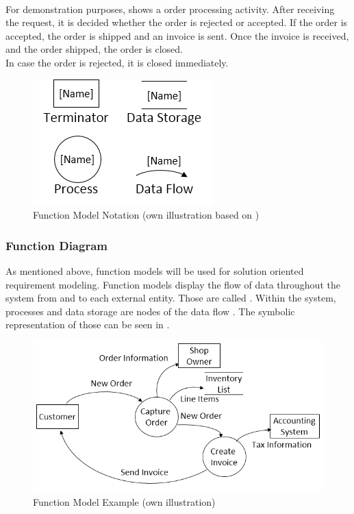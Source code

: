 \paragraph{} For demonstration purposes,  shows a order processing activity. After receiving the request, it is decided whether the order is rejected or accepted. If the order is accepted, the order is shipped and an invoice is sent. Once the invoice is received, and the order shipped, the order is closed. \\
In case the order is rejected, it is closed immediately. 

\begin{figure}[H]
    \centering
    \includegraphics[scale=0.9]{img/fmSymb.png}
    \caption[Function Model Notation]{Function Model Notation (own illustration based on \cite[190]{Pohl.2007})}
    \label{fig:fmSymb}
\end{figure}


\subsubsection{Function Diagram}

As mentioned above, function models will be used for solution oriented requirement modeling. Function models display the flow of data throughout the system from and to each external entity. Those are called  \parencite[190]{Pohl.2007}. Within the system, processes and data storage are nodes of the data flow \parencite[cf.][190-191]{Pohl.2007}. The symbolic representation of those can be seen in .  

\begin{figure}[H]
    \centering
    \includegraphics{img/fmEx.png}
    \caption[Function Model Example]{Function Model Example (own illustration)}
    \label{fig:fmEx}
\end{figure}

